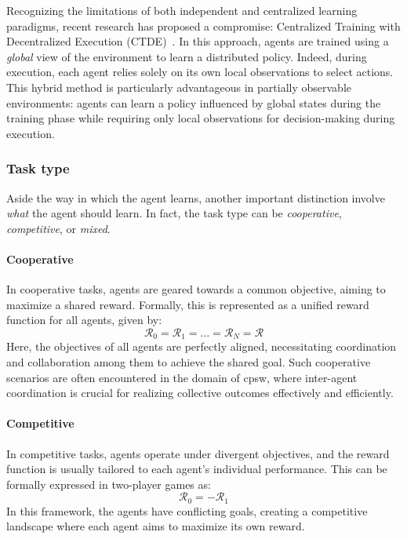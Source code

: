 Recognizing the limitations of both independent and centralized learning paradigms, 
 recent research has proposed a compromise: 
 Centralized Training with Decentralized Execution (CTDE)~\cite{DBLP:conf/nips/LoweWTHAM17}. 
 In this approach, agents are trained using a \emph{global} view of the environment to learn a distributed policy. 
 Indeed, during execution, each agent relies solely on its own local observations to select actions. 
 This hybrid method is particularly advantageous in partially observable environments: 
 agents can learn a policy influenced by global states during the training phase while requiring only local observations for decision-making during execution.

\subsubsection{Task type}
Aside the way in which the agent learns, 
 another important distinction involve \emph{what} the agent should learn.
%
In fact, the task type can be \emph{cooperative}, \emph{competitive}, or \emph{mixed}.
\paragraph*{Cooperative}
In cooperative tasks, 
 agents are geared towards a common objective, 
 aiming to maximize a shared reward. 
 Formally, this is represented as a unified reward function for all agents, given by:
\begin{equation}
\mathcal{R}_0 = \mathcal{R}_1 = \ldots = \mathcal{R}_N = \mathcal{R}
\end{equation}
Here, the objectives of all agents are perfectly aligned, 
 necessitating coordination and collaboration among them to achieve the shared goal. 
 Such cooperative scenarios are often encountered in the domain of \ac{cpsw}, 
 where inter-agent coordination is crucial for realizing collective outcomes effectively and efficiently.
\paragraph*{Competitive}
In competitive tasks, agents operate under divergent objectives, 
 and the reward function is usually tailored to each agent's individual performance. 
This can be formally expressed in two-player games as:
\begin{equation}
\mathcal{R}_0 = -\mathcal{R}_1
\end{equation}
In this framework, the agents have conflicting goals, 
 creating a competitive landscape where each agent aims to maximize its own reward. 
